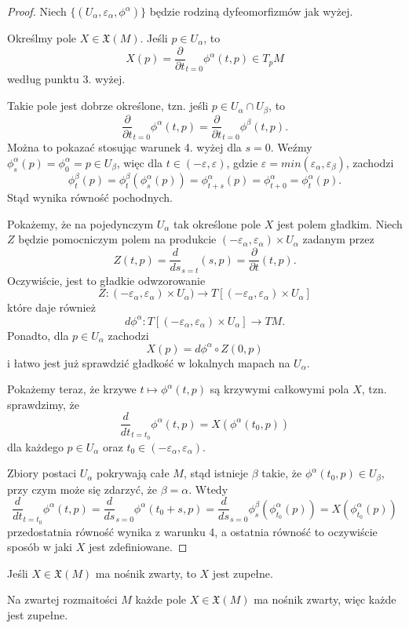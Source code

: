 \begin{proof}
  Niech $\{(U_\alpha,\varepsilon_\alpha,\phi^\alpha)\}$ będzie rodziną dyfeomorfizmów jak wyżej. 

  Określmy pole $X\in\mathfrak{X}(M)$. Jeśli $p\in U_\alpha$, to 
  $$X(p)=\frac{\partial}{\partial t}_{t=0}\phi^\alpha(t, p)\in T_pM$$
  według punktu 3. wyżej.

  Takie pole jest dobrze określone, tzn. jeśli $p\in U_\alpha\cap U_\beta$, to
  $$\frac{\partial}{\partial t}_{t=0}\phi^\alpha(t,p)=\frac{\partial}{\partial t}_{t=0}\phi^\beta(t,p).$$
  Można to pokazać stosując warunek 4. wyżej dla $s=0$. Weźmy $\phi_s^\alpha(p)=\phi_0^\alpha=p\in U_\beta$, więc dla $t\in(-\varepsilon,\varepsilon)$, gdzie $\varepsilon=min(\varepsilon_\alpha,\varepsilon_\beta)$, zachodzi
  $$\phi_t^\beta(p)=\phi_{t}^\beta(\phi_s^\alpha(p))=\phi_{t+s}^\alpha(p)=\phi_{t+0}^\alpha=\phi_t^\alpha(p).$$
  Stąd wynika równość pochodnych.

  Pokażemy, że na pojedynczym $U_\alpha$ tak określone pole $X$ jest polem gładkim. Niech $Z$ będzie pomocniczym polem na produkcie $(-\varepsilon_\alpha,\varepsilon_\alpha)\times U_\alpha$ zadanym przez
  $$Z(t,p)=\frac{d}{ds}_{s=t}(s, p)=\frac{\partial}{\partial t}(t,p).$$
  Oczywiście, jest to gładkie odwzorowanie
  $$Z:(-\varepsilon_\alpha,\varepsilon_\alpha)\times U_\alpha)\to T[(-\varepsilon_\alpha,\varepsilon_\alpha)\times U_\alpha]$$
  które daje również
  $$d\phi^\alpha:T[(-\varepsilon_\alpha,\varepsilon_\alpha)\times U_\alpha]\to TM.$$
  Ponadto, dla $p\in U_\alpha$ zachodzi
  $$X(p)=d\phi^\alpha\circ Z(0,p)$$
  i łatwo jest już sprawdzić gładkość w lokalnych mapach na $U_\alpha$.

  Pokażemy teraz, że krzywe $t\mapsto\phi^\alpha(t,p)$ są krzywymi całkowymi pola $X$, tzn. sprawdzimy, że
  $$\frac{d}{dt}_{t=t_0}\phi^\alpha(t,p)=X(\phi^\alpha(t_0,p))$$
  dla każdego $p\in U_\alpha$ oraz $t_0\in(-\varepsilon_\alpha,\varepsilon_\alpha)$.

  Zbiory postaci $U_\alpha$ pokrywają całe $M$, stąd istnieje $\beta$ takie, że $\phi^\alpha(t_0,p)\in U_\beta$, przy czym może się zdarzyć, że $\beta=\alpha$. Wtedy
  $$\frac{d}{dt}_{t=t_0}\phi^\alpha(t,p)=\frac{d}{ds}_{s=0}\phi^\alpha(t_0+s,p)=\frac{d}{ds}_{s=0}\phi^\beta_s(\phi^\alpha_{t_0}(p))=X(\phi^\alpha_{t_0}(p))$$
  przedostatnia równość wynika z warunku 4, a ostatnia równość to oczywiście sposób w jaki $X$ jest zdefiniowane.
\end{proof}

\begin{theorem}
  Jeśli $X\in\mathfrak{X}(M)$ ma nośnik zwarty, to $X$ jest zupełne.

  Na zwartej rozmaitości $M$ każde pole $X\in\mathfrak{X}(M)$ ma nośnik zwarty, więc każde jest zupełne.
\end{theorem}

